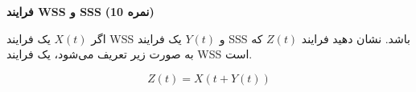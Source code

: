 \Large \textbf{فرایند WSS و SSS}
\large \textbf{(10 نمره)}

\normalsize \vspace{0.5cm}

	اگر
	$X\left( t \right)$
	یک فرایند WSS و
	$Y\left( t \right)$
	یک فرایند SSS باشد. نشان دهید فرایند
	$Z\left( t \right)$
	که به صورت زیر تعریف می‌شود، یک فرایند WSS است.
	
	$$
	Z\left( t \right) = X\left( {t + Y\left( t \right)} \right)
	$$


